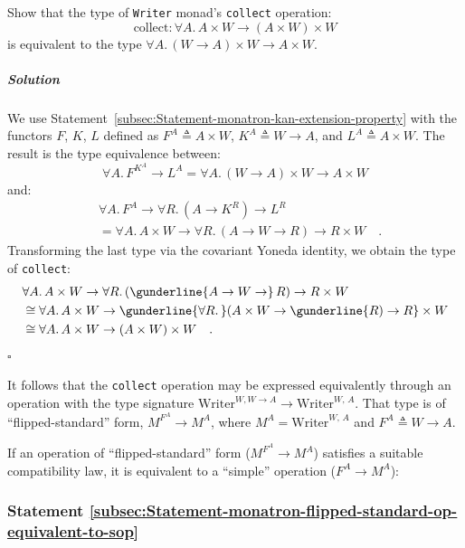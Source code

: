 Show that the type of \lstinline!Writer! monad\textsf{'}s \lstinline!collect!
operation:
\[
\text{collect}:\forall A.\,A\times W\rightarrow(A\times W)\times W
\]
is equivalent to the type $\forall A.\,(W\rightarrow A)\times W\rightarrow A\times W$. 

\subparagraph{Solution}

We use Statement~\ref{subsec:Statement-monatron-kan-extension-property}
with the functors $F$, $K$, $L$ defined as $F^{A}\triangleq A\times W$,
$K^{A}\triangleq W\rightarrow A$, and $L^{A}\triangleq A\times W$.
The result is the type equivalence between:
\[
\forall A.\,F^{K^{A}}\rightarrow L^{A}=\forall A.\,\left(W\rightarrow A\right)\times W\rightarrow A\times W
\]
and:
\begin{align*}
 & \forall A.\,F^{A}\rightarrow\forall R.\,(A\rightarrow K^{R})\rightarrow L^{R}\\
 & =\forall A.\,A\times W\rightarrow\forall R.\,(A\rightarrow W\rightarrow R)\rightarrow R\times W\quad.
\end{align*}
Transforming the last type via the covariant Yoneda identity, we obtain
the type of \lstinline!collect!:
\begin{align*}
 & \forall A.\,A\times W\rightarrow\forall R.\,(\gunderline{A\rightarrow W\rightarrow}\,R)\rightarrow R\times W\\
 & \cong\forall A.\,A\times W\rightarrow\gunderline{\forall R.\,}(A\times W\rightarrow\gunderline{R)\rightarrow R}\times W\\
 & \cong\forall A.\,A\times W\rightarrow\left(A\times W\right)\times W\quad.
\end{align*}
$\square$

It follows that the \lstinline!collect! operation may be expressed
equivalently through an operation with the type signature $\text{Writer}^{W,W\rightarrow A}\rightarrow\text{Writer}^{W,\,A}$.
That type is of \textsf{``}flipped-standard\textsf{''} form, $M^{F^{A}}\rightarrow M^{A}$,
where $M^{A}=\text{Writer}^{W,\,A}$ and $F^{A}\triangleq W\rightarrow A$.

If an operation of \textsf{``}flipped-standard\textsf{''} form ($M^{F^{A}}\rightarrow M^{A}$)
satisfies a suitable compatibility law, it is equivalent to a \textsf{``}simple\textsf{''}
operation ($F^{A}\rightarrow M^{A}$):

\subsubsection{Statement \label{subsec:Statement-monatron-flipped-standard-op-equivalent-to-sop}\ref{subsec:Statement-monatron-flipped-standard-op-equivalent-to-sop}}

